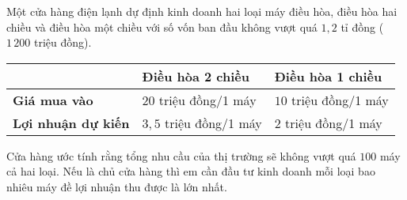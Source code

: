 \begin{bt}%
	Một cửa hàng điện lạnh dự định kinh doanh hai loại máy điều hòa, điều hòa hai chiều và điều hòa một chiều với số vốn ban đầu không vượt quá $1{,}2$ tỉ đồng ($1\,200$ triệu đồng).
	\begin{center}
		\begin{tabular}{|l|l|l|}
			\hline & \textbf{Điều hòa 2 chiều} & \textbf{Điều hòa 1 chiều} \\
			\hline \textbf{Giá mua vào} &$  20 $ triệu đồng/1 máy & $ 10 $ triệu đồng/1 máy \\
			\hline \textbf{Lợi nhuận dự kiến} & $ 3{,}5 $ triệu đồng/1 máy&$2$ triệu đồng/1 máy \\
			\hline
		\end{tabular}
	\end{center}
	Cửa hàng ước tính rằng tổng nhu cầu của thị trường sẽ không vượt quá $100$ máy cả hai loại. Nếu là chủ cửa hàng thì em cần đầu tư kinh doanh mỗi loại bao nhiêu máy đề lợi nhuận thu được là lớn nhất.
\end{bt} 


